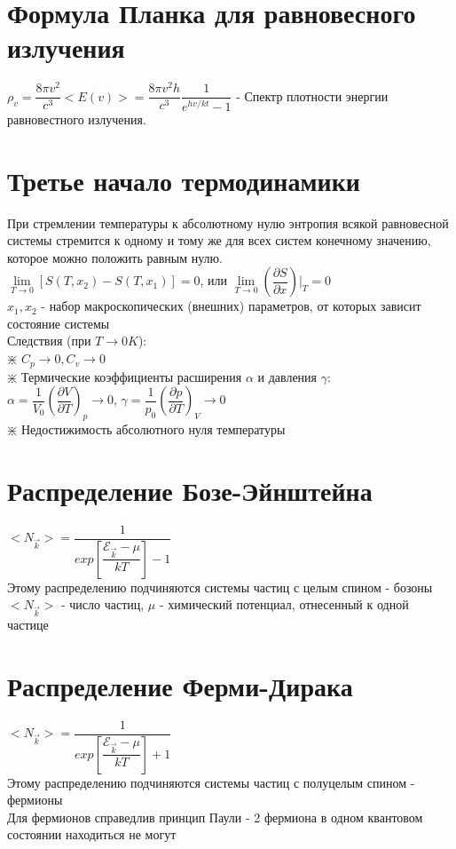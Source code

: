 \begin{multicols*}{2}
		\section{Формула Планка для равновесного излучения}
		$\rho_v=\dfrac{8\pi v^2}{c^3}<E(v)>=\dfrac{8\pi v^2 h}{c^3}\dfrac{1}{e^{hv/kt}-1}$ - Спектр плотности энергии равновестного излучения.

		\section{Третье начало термодинамики}
		При стремлении температуры к абсолютному  нулю энтропия всякой равновесной системы стремится к одному и тому же для всех систем конечному значению, которое можно положить равным нулю.\\
		$\lim\limits_{T\to 0} [ S(T, x_2) - S(T, x_1)] =0$, или $\lim\limits_{T\to 0} \left(\dfrac{\partial S}{\partial x}\right)\vert _T = 0$\\
		$x_1, x_2$ - набор макроскопических (внешних) параметров, от которых зависит состояние системы\\
		Следствия (при $T\rightarrow 0K$):\\
		$\divideontimes$ $C_p \rightarrow 0, C_v \rightarrow 0$\\
		$\divideontimes$ Термические коэффициенты расширения $\alpha$ и давления $\gamma$:\\
		$\alpha = \dfrac{1}{V_0}\left(\dfrac{\partial V}{\partial T}\right)_p \rightarrow 0$, \quad $\gamma = \dfrac{1}{p_0}\left(\dfrac{\partial p}{\partial T}\right)_V \rightarrow 0$\\
		$\divideontimes$ Недостижимость абсолютного нуля температуры

		\section{Распределение Бозе-Эйнштейна}
		$<N_{\vec{k}}> = \dfrac{1}{exp\left[\dfrac{\mathcal{E}_{\vec{k}} - \mu}{kT}\right] - 1}$\\
		Этому распределению подчиняются системы частиц с целым спином - бозоны\\
		$<N_{\vec{k}}>$ - число частиц, $\mu$ - химический потенциал, отнесенный к одной частице

		\section{Распределение Ферми-Дирака}
		$<N_{\vec{k}}> = \dfrac{1}{exp\left[\dfrac{\mathcal{E}_{\vec{k}} - \mu}{kT}\right] + 1}$\\
		Этому распределению подчиняются системы частиц с полуцелым спином - фермионы\\
		Для фермионов справедлив принцип Паули - 2 фермиона в одном квантовом состоянии находиться не могут


\end{multicols*}
